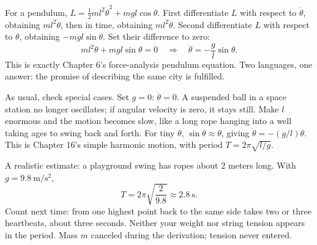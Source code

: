 \begin{mainline}
For a pendulum, \(L=\frac{1}{2}ml^2\dot{\theta}^2+mgl\cos\theta\). First differentiate \(L\) with respect to \(\dot{\theta}\), obtaining \(ml^2\dot{\theta}\), then in time, obtaining \(ml^2\ddot{\theta}\). Second differentiate \(L\) with respect to \(\theta\), obtaining \(-mgl\sin\theta\). Set their difference to zero:
\[
ml^2\ddot{\theta}+mgl\sin\theta=0
\quad\Longrightarrow\quad
\ddot{\theta}=-\frac{g}{l}\sin\theta .
\]
This is exactly Chapter 6's force-analysis pendulum equation. Two languages, one answer: the promise of describing the same city is fulfilled.

As usual, check special cases. Set \(g=0\): \(\ddot{\theta}=0\). A suspended ball in a space station no longer oscillates; if angular velocity is zero, it stays still. Make \(l\) enormous and the motion becomes slow, like a long rope hanging into a well taking ages to swing back and forth. For tiny \(\theta\), \(\sin\theta\approx\theta\), giving \(\ddot{\theta}=-(g/l)\theta\). This is Chapter 16's simple harmonic motion, with period \(T=2\pi\sqrt{l/g}\).

A realistic estimate: a playground swing has ropes about \(2\) meters long. With \(g=9.8\ \mathrm{m/s^2}\),
\[
T=2\pi\sqrt{\frac{2}{9.8}}\approx 2.8\ \mathrm{s}.
\]
Count next time: from one highest point back to the same side takes two or three heartbeats, about three seconds. Neither your weight nor string tension appears in the period. Mass \(m\) canceled during the derivation; tension never entered.
\end{mainline}

